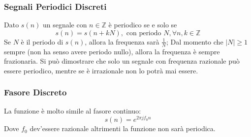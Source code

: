 \subsubsection{Segnali Periodici Discreti}
Dato $s(n)$ un segnale con $n \in \mathbb{Z}$ è periodico se e solo se
\begin{equation}
    s(n) = s(n + kN), \mbox{ con periodo }N, \forall n,k \in \mathbb{Z}
\end{equation}
Se $N$ è il periodo di $s(n)$, allora la frequenza sarà $\frac{1}{N}$; Dal momento che $|N| \geq 1$ sempre (non ha senso avere periodo nullo), allora la frequenza è sempre frazionaria.
Si può dimostrare che solo un segnale con frequenza razionale può essere periodico, mentre se è irrazionale non lo potrà mai essere.

\subsubsection{Fasore Discreto}
La funzione è molto simile al fasore continuo:
\begin{equation}
    s(n) = e^{2\pi j f_0 n}
\end{equation}
Dove $f_0$ dev'essere razionale altrimenti la funzione non sarà periodica.